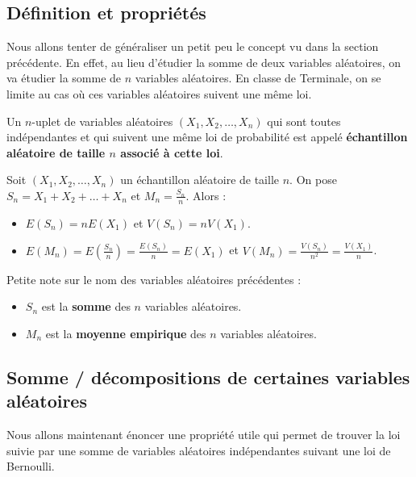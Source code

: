 	\subsection{Définition et propriétés}

	Nous allons tenter de généraliser un petit peu le concept vu dans la section précédente. En effet, au lieu d'étudier la somme de deux variables aléatoires, on va étudier la somme de $n$ variables aléatoires.
	\newpar
	En classe de Terminale, on se limite au cas où ces variables aléatoires suivent une même loi.

	\begin{formula}
		Un $n$-uplet de variables aléatoires $(X_1, X_2, \dots, X_n)$ qui sont toutes indépendantes et qui suivent une même loi de probabilité est appelé \textbf{échantillon aléatoire de taille $n$ associé à cette loi}.
	\end{formula}

	\begin{formula}
		Soit $(X_1, X_2, \dots, X_n)$ un échantillon aléatoire de taille $n$. On pose $S_n = X_1 + X_2 + \dots + X_n$ et $M_n = \frac{S_n}{n}$. Alors :
		\begin{itemize}
			\item $E(S_n) = nE(X_1)$ et $V(S_n) = nV(X_1)$.
			\item $E(M_n) = E\left(\frac{S_n}{n}\right) = \frac{E(S_n)}{n} = E(X_1)$ et $V(M_n) = \frac{V(S_n)}{n^2} = \frac{V(X_1)}{n}$.
		\end{itemize}
	\end{formula}

	\begin{tip}[Note]
		Petite note sur le nom des variables aléatoires précédentes :
		\begin{itemize}
			\item $S_n$ est la \textbf{somme} des $n$ variables aléatoires.
			\item $M_n$ est la \textbf{moyenne empirique} des $n$ variables aléatoires.
		\end{itemize}
	\end{tip}

	\subsection{Somme / décompositions de certaines variables aléatoires}

	Nous allons maintenant énoncer une propriété utile qui permet de trouver la loi suivie par une somme de variables aléatoires indépendantes suivant une loi de Bernoulli.

